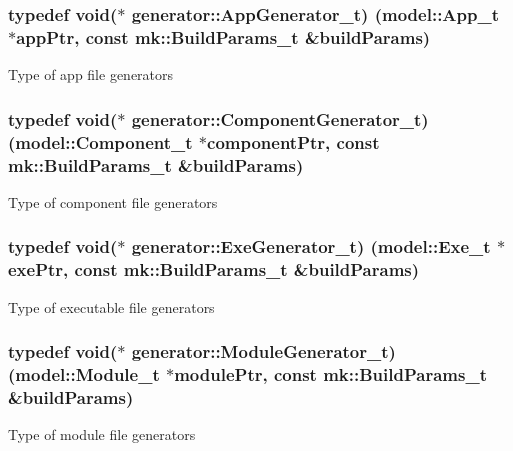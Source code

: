 \subsubsection[{\texorpdfstring{App\+Generator\+\_\+t}{AppGenerator_t}}]{\setlength{\rightskip}{0pt plus 5cm}typedef {\bf void}($\ast$ generator\+::\+App\+Generator\+\_\+t) ({\bf model\+::\+App\+\_\+t} $\ast$app\+Ptr, const {\bf mk\+::\+Build\+Params\+\_\+t} \&build\+Params)}\hypertarget{namespacegenerator_a0dab6a94633151cc90073170ce71a25c}{}\label{namespacegenerator_a0dab6a94633151cc90073170ce71a25c}
Type of app file generators 
\subsubsection[{\texorpdfstring{Component\+Generator\+\_\+t}{ComponentGenerator_t}}]{\setlength{\rightskip}{0pt plus 5cm}typedef {\bf void}($\ast$ generator\+::\+Component\+Generator\+\_\+t) ({\bf model\+::\+Component\+\_\+t} $\ast$component\+Ptr, const {\bf mk\+::\+Build\+Params\+\_\+t} \&build\+Params)}\hypertarget{namespacegenerator_a51a9c405b080b56f182d2a9324a9325d}{}\label{namespacegenerator_a51a9c405b080b56f182d2a9324a9325d}
Type of component file generators 
\subsubsection[{\texorpdfstring{Exe\+Generator\+\_\+t}{ExeGenerator_t}}]{\setlength{\rightskip}{0pt plus 5cm}typedef {\bf void}($\ast$ generator\+::\+Exe\+Generator\+\_\+t) ({\bf model\+::\+Exe\+\_\+t} $\ast$exe\+Ptr, const {\bf mk\+::\+Build\+Params\+\_\+t} \&build\+Params)}\hypertarget{namespacegenerator_a8cae660bbcd34ce61bd0d4e2d526dac0}{}\label{namespacegenerator_a8cae660bbcd34ce61bd0d4e2d526dac0}
Type of executable file generators 
\subsubsection[{\texorpdfstring{Module\+Generator\+\_\+t}{ModuleGenerator_t}}]{\setlength{\rightskip}{0pt plus 5cm}typedef {\bf void}($\ast$ generator\+::\+Module\+Generator\+\_\+t) ({\bf model\+::\+Module\+\_\+t} $\ast$module\+Ptr, const {\bf mk\+::\+Build\+Params\+\_\+t} \&build\+Params)}\hypertarget{namespacegenerator_a969256f0961bca1b4561e72ab10bae5c}{}\label{namespacegenerator_a969256f0961bca1b4561e72ab10bae5c}
Type of module file generators 
